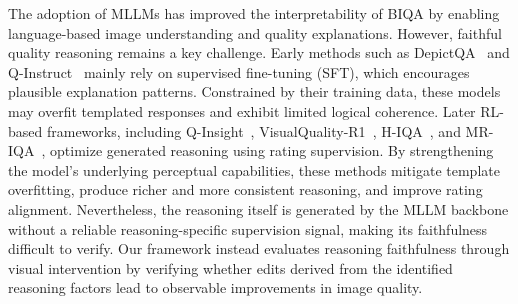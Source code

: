 \documentclass[letterpaper]{article} %
\begin{document}
The adoption of MLLMs has improved the interpretability of BIQA by enabling language-based image understanding and quality explanations. However, faithful quality reasoning remains a key challenge. Early methods such as DepictQA~\citep{depictqa} and Q-Instruct~\citep{q-instruct} mainly rely on supervised fine-tuning (SFT), which encourages plausible explanation patterns. Constrained by their training data, these models may overfit templated responses and exhibit limited logical coherence. Later RL-based frameworks, including Q-Insight~\citep{q-insight}, VisualQuality-R1~\citep{Visualquality-r1}, H-IQA~\citep{h-iqa}, and MR-IQA~\citep{mr-iqa}, optimize generated reasoning using rating supervision. By strengthening the model's underlying perceptual capabilities, these methods mitigate template overfitting, produce richer and more consistent reasoning, and improve rating alignment. Nevertheless, the reasoning itself is generated by the MLLM backbone without a reliable reasoning-specific supervision signal, making its faithfulness difficult to verify. Our framework instead evaluates reasoning faithfulness through visual intervention by verifying whether edits derived from the identified reasoning factors lead to observable improvements in image quality.



%
\end{document}
